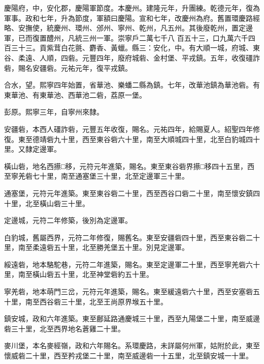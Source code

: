 \begin{pinyinscope}
 慶陽府，中，安化郡，慶陽軍節度。本慶州。建隆元年，升團練。乾德元年，復為軍事。政和七年，升為節度，軍額曰慶陽。宣和七年，改慶州為府。舊置環慶路經略、安撫使，統慶州、環州、邠州、寧州、乾州，凡五州。其後廢乾州，置定邊軍，已而復置醴州，凡統三州一軍。崇寧戶二萬七千八
 百五十三，口九萬六千四百三十三。貢紫茸白花氈、麝香、黃蠟。縣三：安化，中。有大順一城，府城、東谷、柔遠、人順，四砦。元豐四年，廢府城砦、金村堡、平戎鎮。五年，收復礓詐砦，賜名安疆砦。元祐元年，復平戎鎮。



 合水，望。熙寧四年始置，省華池、樂蟠二縣為鎮。七年，改華池鎮為華池砦。有東華池、有東華池、西華池二砦，荔原一堡。



 彭原。熙寧三年，自寧州來隸。



 安疆砦，本西人礓詐砦，元豐五年收復，賜名。元祐四年，給賜夏人。紹聖四年修復。東至德靖砦九十里，西至東谷砦六十里，南至大順城四十里，北至白豹城四十里。又隸定邊軍。



 橫山砦，地名西攃□移，元符元年進築，賜名。東至東谷砦界攃□移四十五里，西至寧羌砦七十里，南至通塞堡三十里，北至定邊軍三十里。



 通塞堡，元符元年進築。東至東谷砦二十里，西至西谷口砦二十里，南至懷安鎮四十里，北至橫山砦三十里。



 定邊城，元符二年修築，後別為定邊軍。



 白豹城，舊屬西界，元符二年修復，賜舊名。東至安疆砦四十里，西至東谷砦二十里，南至柔遠砦五十里，北至勝羌堡五十里。別見定邊軍。



 綏遠砦，地本駱駝巷，元符二年進築，賜名。東至定邊軍二十里，西至寧羌砦六十里，南至橫山砦五十里，北至神堂砦約五十里。



 寧羌砦，地本萌門三岔，元符元年進築，賜名。東至緩遠砦六十里，西至安塞砦五十里，南至西谷砦三十里，北至王尚原界堠五十里。



 鎮安城，政和六年進築。東至鄜延路通慶城三十里，西至九陽堡二十里，南至威邊砦三十里，北至西界地名蒼雞二十里。



 麥川堡，本名麥經嶺，政和六年賜名。系環慶路，未詳屬何州軍，姑附於此，東至懷威砦二十里，西至矜戎堡二十里，南至威邊砦一十五里，北至鎮安城一十里。




\end{pinyinscope}
